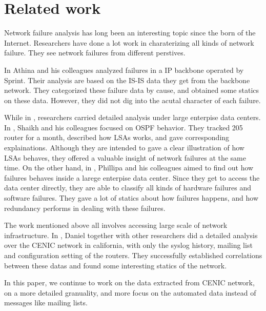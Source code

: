 \documentclass[conference, twocolumn, oneside, 10pt]{IEEEtran}
\begin{document}
\section{Related work}
\label{sec:sec2}

Network failure analysis has long been an interesting topic since the born of
the Internet\cite{Baran_1964}. Researchers have done a lot work in charaterizing all kinds of network failure\cite{  Chandra:2008:CFA:1453175.1453178, Gill:2011:UNF:2018436.2018477, Markopoulou:2008:CFO:1453698.1453699, Shaikh:2002:CSO:637201.637236, turner2010california}. They see network failures from different perstives.

In \cite{Markopoulou:2008:CFO:1453698.1453699} Athina and his colleagues analyzed failures in a IP backbone operated by Sprint. Their analysis are based on the IS-IS data they get from the backbone network. They categorized these failure data by cause, and obtained some statics on these data. However, they did not dig into the acutal character of each failure.

While in \cite{Shaikh:2002:CSO:637201.637236, Gill:2011:UNF:2018436.2018477}, researchers carried detailed analysis under large enterpise data centers. In \cite{Shaikh:2002:CSO:637201.637236}, Shaikh and his colleagues focused on OSPF behavior. They tracked 205 router for a month, described how LSAs works, and gave corresponding explainations. Although they are intended to gave a clear illustration of how LSAs behaves, they offered a valuable insight of network failures at the same time. On the other hand, in \cite{Gill:2011:UNF:2018436.2018477}, Phillipa and his colleagues aimed to find out how failures behaves inside a larege enterpise data center. Since they get to access the data center directly, they are able to classify all kinds of hardware failures and software failures. They gave a lot of statics about how failures happens, and how redundancy performs in dealing with these failures. 

The work mentioned above all involves accessing large scale of network infrastructure. In \cite{turner2010california}, Daniel together with other researchers did a detailed analysis over the CENIC network in california, with only the syslog history, mailing list and configuration setting of the routers. They successfully established correlations between these datas and found some interesting statics of the network.

In this paper, we continue to work on the data extracted from CENIC network, on a more detailed granuality, and more focus on the automated data instead of messages like mailing lists.
\end{document}
